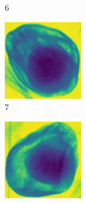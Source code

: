 \documentclass[11pt]{article}
\begin{document}
\begin{figure}[!h]
\begin{subfigure}[b]{0.22\textwidth}
         \caption{6}
         \label{fig:avo_5}
     \end{subfigure}
     \hfill
     \begin{subfigure}[b]{0.22\textwidth}
         \centering
         \includegraphics[width=\textwidth]{figurer/avocado_dataset/avo_6.jpg}
         \caption{7}
         \label{fig:avo_6}
     \end{subfigure}
     \hfill
     \begin{subfigure}[b]{0.22\textwidth}
         \centering
         \includegraphics[width=\textwidth]{figurer/avocado_dataset/avo_7.jpg}

\end{subfigure}
\end{figure}
\end{document}
